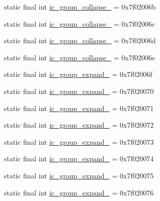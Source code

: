 \begin{CompactItemize}
\item 
static final int \hyperlink{classandroid_1_1support_1_1v7_1_1recyclerview_1_1_r_1_1drawable_116a3492f074c32f121c5cbf6126c960}{ic\_\-group\_\-collapse\_} = 0x7f02006b
\item 
static final int \hyperlink{classandroid_1_1support_1_1v7_1_1recyclerview_1_1_r_1_1drawable_e79161412e8e3d59377f27263e2b3079}{ic\_\-group\_\-collapse\_} = 0x7f02006c
\item 
static final int \hyperlink{classandroid_1_1support_1_1v7_1_1recyclerview_1_1_r_1_1drawable_73a59e6fcd4b62db8e640087359a386e}{ic\_\-group\_\-collapse\_} = 0x7f02006d
\item 
static final int \hyperlink{classandroid_1_1support_1_1v7_1_1recyclerview_1_1_r_1_1drawable_ba67745691320eff0adcb09d8f177c0d}{ic\_\-group\_\-collapse\_} = 0x7f02006e
\item 
static final int \hyperlink{classandroid_1_1support_1_1v7_1_1recyclerview_1_1_r_1_1drawable_42cd9693782e73ff81ee3d648346ec4a}{ic\_\-group\_\-expand\_} = 0x7f02006f
\item 
static final int \hyperlink{classandroid_1_1support_1_1v7_1_1recyclerview_1_1_r_1_1drawable_103f2124756df0bfec0cbe7b8914092b}{ic\_\-group\_\-expand\_} = 0x7f020070
\item 
static final int \hyperlink{classandroid_1_1support_1_1v7_1_1recyclerview_1_1_r_1_1drawable_4eca11a7b69e01cd499ea4d6845bd469}{ic\_\-group\_\-expand\_} = 0x7f020071
\item 
static final int \hyperlink{classandroid_1_1support_1_1v7_1_1recyclerview_1_1_r_1_1drawable_b7166952fa989c698b1bdb2a46bd0790}{ic\_\-group\_\-expand\_} = 0x7f020072
\item 
static final int \hyperlink{classandroid_1_1support_1_1v7_1_1recyclerview_1_1_r_1_1drawable_ea30dab92c616ee929d8ff01310e584c}{ic\_\-group\_\-expand\_} = 0x7f020073
\item 
static final int \hyperlink{classandroid_1_1support_1_1v7_1_1recyclerview_1_1_r_1_1drawable_30aee537f13b524747666a2dd9834461}{ic\_\-group\_\-expand\_} = 0x7f020074
\item 
static final int \hyperlink{classandroid_1_1support_1_1v7_1_1recyclerview_1_1_r_1_1drawable_429c06c296fe250b4d0a1e9a643c913e}{ic\_\-group\_\-expand\_} = 0x7f020075
\item 
static final int \hyperlink{classandroid_1_1support_1_1v7_1_1recyclerview_1_1_r_1_1drawable_412d70aaedab89b5bf4a4767216b4ec4}{ic\_\-group\_\-expand\_} = 0x7f020076
\item 

\end{CompactItemize}
